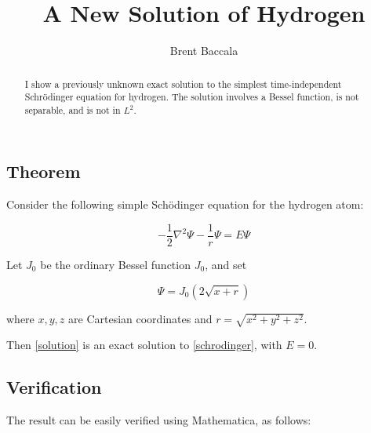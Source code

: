 \documentclass{article}
\title{A New Solution of Hydrogen}
\author{Brent Baccala}
\begin{document}
\parindent 0pt

\maketitle

\begin{abstract}
I show a previously unknown exact solution to the simplest time-independent Schr\"odinger equation for hydrogen.
The solution involves a Bessel function, is not separable, and is not in $L^2$.
\end{abstract}

\subsection*{Theorem}

Consider the following simple Sch\"odinger equation for the hydrogen atom:

\begin{equation}
\label{schrodinger}
-\frac{1}{2}\nabla^2 \Psi - \frac{1}{r}\Psi = E \Psi
\end{equation}

Let $J_0$ be the ordinary Bessel function $J_0$, and set

\begin{equation}
\label{solution}
\Psi = J_0(2\sqrt{x+r})
\end{equation}

where $x,y,z$ are Cartesian coordinates and $r=\sqrt{x^2+y^2+z^2}$.

\vskip 12pt

Then \eqref{solution} is an exact solution to \eqref{schrodinger}, with $E=0$.

\subsection*{Verification}

The result can be easily verified using Mathematica, as follows:
\end{document}
